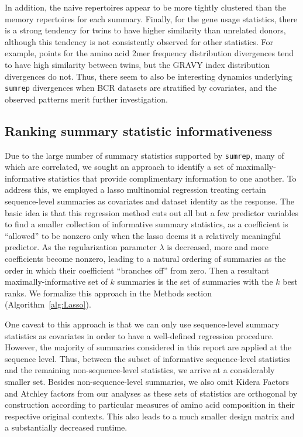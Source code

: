 \documentclass{article}
\begin{document}
In addition, the naive repertoires appear to be more tightly clustered than the memory repertoires for each summary.
Finally, for the gene usage statistics, there is a strong tendency for twins to have higher similarity than unrelated donors, although this tendency is not consistently observed for other statistics.
For example, points for the amino acid 2mer frequency distribution divergences tend to have high similarity between twins, but the GRAVY index distribution divergences do not.
Thus, there seem to also be interesting dynamics underlying \texttt{sumrep} divergences when BCR datasets are stratified by covariates, and the observed patterns merit further investigation.

\subsection*{Ranking summary statistic informativeness}
Due to the large number of summary statistics supported by \texttt{sumrep}, many of which are correlated, we sought an approach to identify a set of maximally-informative statistics that provide complimentary information to one another.
To address this, we employed a lasso multinomial regression treating certain sequence-level summaries as covariates and dataset identity as the response.
The basic idea is that this regression method cuts out all but a few predictor variables to find a smaller collection of informative summary statistics, as a coefficient is ``allowed'' to be nonzero only when the lasso deems it a relatively meaningful predictor.
As the regularization parameter $\lambda$ is decreased, more and more coefficients  become nonzero, leading to a natural ordering of summaries as the order in which their coefficient ``branches off'' from zero.
Then a resultant maximally-informative set of $k$ summaries is the set of summaries with the $k$ best ranks.
We formalize this approach in the Methods section (Algorithm~\ref{alg:Lasso}).

One caveat to this approach is that we can only use sequence-level summary statistics as covariates in order to have a well-defined regression procedure.
However, the majority of summaries considered in this report are applied at the sequence level.
Thus, between the subset of informative sequence-level statistics and the remaining non-sequence-level statistics, we arrive at a considerably smaller set.
Besides non-sequence-level summaries, we also omit Kidera Factors and Atchley factors from our analyses as these sets of statistics are orthogonal by construction according to particular measures of amino acid composition in their respective original contexts.
This also leads to a much smaller design matrix and a substantially decreased runtime.
\end{document}
